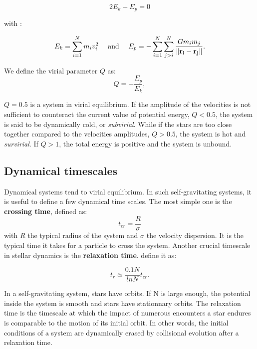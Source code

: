 \begin{equation}
2 E_k + E_p = 0
\end{equation}

with :

\begin{equation}
 E_k = \sum_{i=1}^N m_i v_i^2 ~~~~\textrm{and}~~~~ E_p = - \sum_{i=1}^N \sum_{j>i}^N \frac{G m_i m_j}{\| \bold{r_i} - \bold{r_j}\| } .
\end{equation}

We define the virial parameter $Q$ as:
\begin{equation}
Q = - \frac{E_p}{E_k},
\end{equation}

$Q=0.5$ is a system in virial equilibrium. If the amplitude of the velocities is not sufficient to counteract the current value of potential energy, $Q<0.5$, the system is said to be dynamically cold, or \textit{subvirial}. While if the stars are too close together compared to the velocities amplitudes, $Q>0.5$, the system is hot and \textit{survirial}. If $Q>1$, the total energy is positive and the system is unbound. 


\subsection{Dynamical timescales}

Dynamical systems tend to virial equilibrium. In such self-gravitating systems, it is useful to define a few dynamical time scales. The most simple one is the \textbf{crossing time}, defined as:
\begin{equation}
\label{Eq:0_tcr}
t_{cr} = \frac{R}{\sigma}
\end{equation}
with $R$ the typical radius of the system and $\sigma$ the velocity dispersion. It is the typical time it takes for a particle to cross the system. Another crucial timescale in stellar dynamics is the \textbf{relaxation time}. \cite{BT} define it as:

\begin{equation}
\label{Eq:0_tr}
t_r \simeq \frac{0.1 N}{ln N} t_{cr}.
\end{equation}

In a self-gravitating system, stars have orbits. If N is large enough, the potential inside the system is smooth and stars have stationnary orbits. The relaxation time is the timescale at which the impact of numerous encounters a star endures is comparable to the motion of its initial orbit. In other words, the initial conditions of a system are dynamically erased by collisional evolution after a relaxation time.

